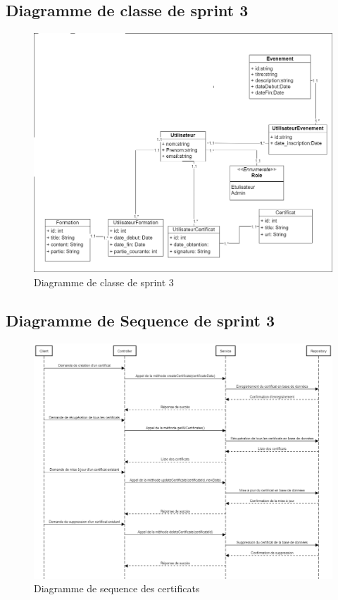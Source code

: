 \documentclass[a4paper, 11pt, openany]{report}
\begin{document}
\subsection{Diagramme de classe de sprint 3}

\begin{figure}[H]
\centering
\includegraphics[width=\textwidth]{sprint2-class.png} 
\caption{Diagramme de classe de sprint 3}
\label{fig:s3_class}
\end{figure}

\subsection{Diagramme de Sequence de sprint 3}
\clearpage
\begin{figure}
\centering
\includegraphics[width=\textwidth]{seq-certifs.png} 
\caption{Diagramme de sequence des certificats}
\label{fig:seq_certifs}
\end{figure}
\end{document}
